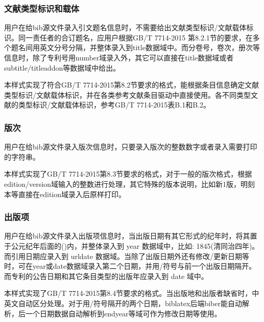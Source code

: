 \subsubsection{文献类型标识和载体}

\begin{property}{}{}
用户在给bib源文件录入引文题名信息时，不需要给出文献类型标识/文献载体标识。同一责任者的合订题名，应用户根据GB/T 7714-2015 第8.2.1节的要求，在多个题名间用英文分号分隔，并整体录入到title数据域中。而分卷号，卷次，册次等信息时，除了专利号用number域录入外，其它可以直接在title数据域或者subtitle/titleaddon等数据域中给出。

本样式实现了符合GB/T 7714-2015第8.2节要求的格式，能根据条目信息确定文献类型标识/文献载体标识，并在各类参考文献条目驱动中直接使用。各不同类型文献的类型标识/文献载体标识，参考GB/T 7714-2015表B.1和B.2。
\end{property}

\subsubsection{版次}\label{sec:fmt:edition}

\begin{property}{}{}
用户在给bib源文件录入版次信息时，只要录入版次的整数数字或者录入需要打印的字符串。

本样式实现了GB/T 7714-2015第8.3节要求的格式，对于一般的版次格式，根据edition/version域输入的整数进行处理，其它特殊的版本说明，比如新1版，明刻本等直接在edition域录入后原样打印。
\end{property}

\subsubsection{出版项}\label{sec:fmt:pubitem}

\begin{property}{}{}
用户在给bib源文件录入出版项信息时，当出版日期有其它形式的纪年时，将其置于公元纪年后面的()内，并整体录入到 year 数据域中，比如: 1845(清同治四年)。而引用日期应录入到 urldate 数据域。当除了出版日期外还有修改/更新日期等时，可在year或date数据域录入第二个日期，并用/符号与前一个出版日期隔开。而专利的公告日期和其它条目类型的出版年应录入到 date 域中。

本样式实现了GB/T 7714-2015第8.4节要求的格式。当出版地和出版者缺省时，中英文自动区分处理。对于用/符号隔开的两个日期，biblatex后端biber能自动解析，后一个日期数据自动解析到endyear等域可作为修改日期等使用。
\end{property}

